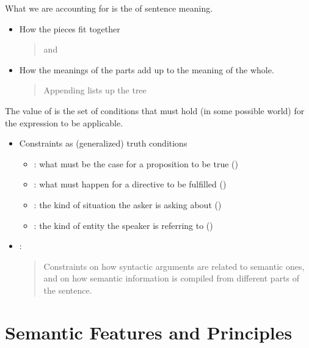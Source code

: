 \documentclass[a4paper,landscape,headrule,footrule]{foils}
\begin{document}

What we are accounting for is the  of
sentence meaning.

\begin{itemize}
\item How the pieces fit together
  \begin{quote}
     and     
  \end{quote}
\item How the meanings of the parts add up to the meaning
of the whole.
\begin{quote}
  Appending  lists up the tree  
\end{quote}
\end{itemize}

The value of  is the set of conditions that must
hold (in some possible world) for the expression to be applicable.

\begin{itemize}
\item Constraints as (generalized) truth conditions
  \begin{itemize}
\item {}: what must be the case for a proposition to be true
  \hfill ()
\item {}: what must happen for a directive to be fulfilled
  \hfill ()
\item {}: the kind of situation the asker is asking about
  \hfill ()
\item {}: the kind of entity the speaker is referring to
  \hfill ()
\end{itemize}
\item {}: 
  \begin{quote}
    Constraints on how syntactic arguments are related to semantic
    ones, and on how semantic information is compiled from different
    parts of the sentence.
  \end{quote}
\end{itemize}

\section[Semantic features and principles: building the semantics of phrases]{Semantic Features and Principles}
\end{document}
